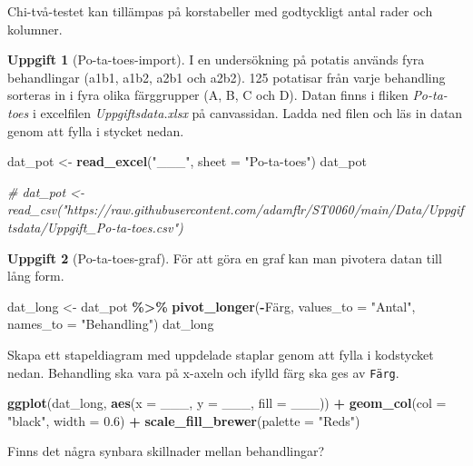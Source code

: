 \documentclass[
]{book}
\newenvironment{Shaded}{\begin{snugshade}}{\end{snugshade}}
\newcommand{\AttributeTok}[1]{\textcolor[rgb]{0.13,0.29,0.53}{#1}}
\newcommand{\CommentTok}[1]{\textcolor[rgb]{0.56,0.35,0.01}{\textit{#1}}}
\newcommand{\FloatTok}[1]{\textcolor[rgb]{0.00,0.00,0.81}{#1}}
\newcommand{\FunctionTok}[1]{\textcolor[rgb]{0.13,0.29,0.53}{\textbf{#1}}}
\newcommand{\NormalTok}[1]{#1}
\newcommand{\OtherTok}[1]{\textcolor[rgb]{0.56,0.35,0.01}{#1}}
\newcommand{\SpecialCharTok}[1]{\textcolor[rgb]{0.81,0.36,0.00}{\textbf{#1}}}
\newcommand{\StringTok}[1]{\textcolor[rgb]{0.31,0.60,0.02}{#1}}
\theoremstyle{definition}
\theoremstyle{definition}
\theoremstyle{definition}
\newtheorem{exercise}{Uppgift}[chapter]
\theoremstyle{definition}
\theoremstyle{remark}
\begin{document}
Chi-två-testet kan tillämpas på korstabeller med godtyckligt antal rader och kolumner.

\begin{exercise}[Po-ta-toes-import]

I en undersökning på potatis används fyra behandlingar (a1b1, a1b2, a2b1 och a2b2). 125 potatisar från varje behandling sorteras in i fyra olika färggrupper (A, B, C och D). Datan finns i fliken \emph{Po-ta-toes} i excelfilen \emph{Uppgiftsdata.xlsx} på canvassidan. Ladda ned filen och läs in datan genom att fylla i stycket nedan.

\begin{Shaded}
\begin{Highlighting}[]
\NormalTok{dat\_pot }\OtherTok{\textless{}{-}} \FunctionTok{read\_excel}\NormalTok{(}\StringTok{"\_\_\_"}\NormalTok{, }\AttributeTok{sheet =} \StringTok{"Po{-}ta{-}toes"}\NormalTok{)}
\NormalTok{dat\_pot}

\CommentTok{\# dat\_pot \textless{}{-} read\_csv("https://raw.githubusercontent.com/adamflr/ST0060/main/Data/Uppgiftsdata/Uppgift\_Po{-}ta{-}toes.csv")}
\end{Highlighting}
\end{Shaded}

\end{exercise}

\begin{exercise}[Po-ta-toes-graf]
För att göra en graf kan man pivotera datan till lång form.

\begin{Shaded}
\begin{Highlighting}[]
\NormalTok{dat\_long }\OtherTok{\textless{}{-}}\NormalTok{ dat\_pot }\SpecialCharTok{\%\textgreater{}\%} \FunctionTok{pivot\_longer}\NormalTok{(}\SpecialCharTok{{-}}\NormalTok{Färg, }\AttributeTok{values\_to =} \StringTok{"Antal"}\NormalTok{, }\AttributeTok{names\_to =} \StringTok{"Behandling"}\NormalTok{)}
\NormalTok{dat\_long}
\end{Highlighting}
\end{Shaded}

Skapa ett stapeldiagram med uppdelade staplar genom att fylla i kodstycket nedan. Behandling ska vara på x-axeln och ifylld färg ska ges av \texttt{Färg}.

\begin{Shaded}
\begin{Highlighting}[]
\FunctionTok{ggplot}\NormalTok{(dat\_long, }\FunctionTok{aes}\NormalTok{(}\AttributeTok{x =}\NormalTok{ \_\_\_, }\AttributeTok{y =}\NormalTok{ \_\_\_, }\AttributeTok{fill =}\NormalTok{ \_\_\_)) }\SpecialCharTok{+}
  \FunctionTok{geom\_col}\NormalTok{(}\AttributeTok{col =} \StringTok{"black"}\NormalTok{, }\AttributeTok{width =} \FloatTok{0.6}\NormalTok{) }\SpecialCharTok{+}
  \FunctionTok{scale\_fill\_brewer}\NormalTok{(}\AttributeTok{palette =} \StringTok{"Reds"}\NormalTok{)}
\end{Highlighting}
\end{Shaded}

Finns det några synbara skillnader mellan behandlingar?
\end{exercise}
\end{document}
